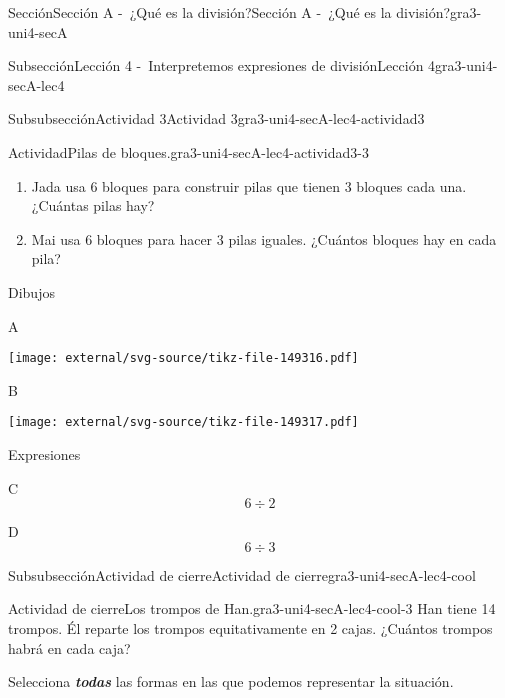 \documentclass[twoside,14pt,]{extarticle}
\newcommand{\alert}[1]{\textbf{\textit{#1}}}
\begin{document}
\begin{sectionptx}{Sección}{Sección A -~¿Qué es la división?}{}{Sección A -~¿Qué es la división?}{}{}{gra3-uni4-secA}
\begin{subsectionptx}{Subsección}{Lección 4 -~Interpretemos expresiones de división}{}{Lección 4}{}{}{gra3-uni4-secA-lec4}
\begin{subsubsectionptx}{Subsubsección}{Actividad 3}{}{Actividad 3}{}{}{gra3-uni4-secA-lec4-actividad3}
\begin{activity}{Actividad}{Pilas de bloques.}{gra3-uni4-secA-lec4-actividad3-3}
\begin{enumerate}
\item{}Jada usa 6 bloques para construir pilas que tienen 3 bloques cada una. ¿Cuántas pilas hay?%
\item{}Mai usa 6 bloques para hacer 3 pilas iguales. ¿Cuántos bloques hay en cada pila?%
\end{enumerate}
Dibujos%
\begin{sidebyside}{2}{0.05}{0.05}{0.1}%
\begin{sbspanel}{0.4}%
A%
\par
\texttt{[image: external/svg-source/tikz-file-149316.pdf]}
\end{sbspanel}%
\begin{sbspanel}{0.4}%
B%
\par
\texttt{[image: external/svg-source/tikz-file-149317.pdf]}
\end{sbspanel}%
\end{sidebyside}%
\par
Expresiones%
\begin{sidebyside}{2}{0.05}{0.05}{0.1}%
\begin{sbspanel}{0.4}%
C%
\begin{equation*}
6\div 2
\end{equation*}
%
\end{sbspanel}%
\begin{sbspanel}{0.4}%
\par
D%
\begin{equation*}
6\div 3
\end{equation*}
%
\end{sbspanel}%
\end{sidebyside}%
\end{activity}%
\end{subsubsectionptx}
%
%
\typeout{************************************************}
\typeout{************************************************}
%
\begin{subsubsectionptx}{Subsubsección}{Actividad de cierre}{}{Actividad de cierre}{}{}{gra3-uni4-secA-lec4-cool}
\begin{project}{Actividad de cierre}{Los trompos de Han.}{gra3-uni4-secA-lec4-cool-3}%
Han tiene 14 trompos. Él reparte los trompos equitativamente en 2 cajas. ¿Cuántos trompos habrá en cada caja?%
\par
Selecciona \alert{todas} las formas en las que podemos representar la situación.%
\begin{sidebyside}{4}{0.0075}{0.0075}{0.015}%

\end{sidebyside}
\end{project}
\end{subsubsectionptx}
\end{subsectionptx}
\end{sectionptx}
\end{document}
